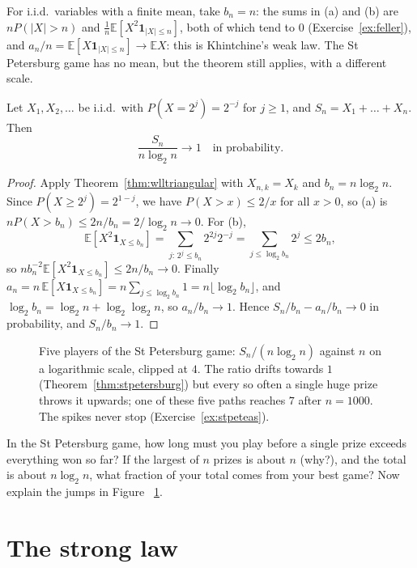 For i.i.d.\ variables with a finite mean, take $b_n=n$: the sums in (a) and (b) are $nP(|X|>n)$ and $\frac1n\mathbb E[X^2\mathbf 1_{|X|\le n}]$, both
of which tend to $0$ (Exercise~\ref{ex:feller}), and $a_n/n=\mathbb E[X\mathbf 1_{|X|\le n}]\to\mathbb E X$: this is Khintchine's weak law. The
St Petersburg game has no mean, but the theorem still applies, with a different scale.

\begin{theorem}[Feller, 1945]\label{thm:stpetersburg}
Let $X_1,X_2,\dots$ be i.i.d.\ with $P(X=2^j)=2^{-j}$ for $j\ge1$, and $S_n=X_1+\dots+X_n$. Then
\[
\frac{S_n}{n\log_2n}\to1\quad\text{in probability.}
\]
\end{theorem}
\begin{proof}
Apply Theorem~\ref{thm:wlltriangular} with $X_{n,k}=X_k$ and $b_n=n\log_2n$. Since $P(X\ge2^j)=2^{1-j}$, we have $P(X>x)\le2/x$ for all
$x>0$, so (a) is $nP(X>b_n)\le2n/b_n=2/\log_2n\to0$. For (b),
\[
\mathbb E[X^2\mathbf 1_{X\le b_n}]=\sum_{j:\,2^j\le b_n}2^{2j}2^{-j}=\sum_{j\le\log_2b_n}2^j\le2b_n,
\]
so $nb_n^{-2}\mathbb E[X^2\mathbf 1_{X\le b_n}]\le2n/b_n\to0$. Finally $a_n=n\,\mathbb E[X\mathbf 1_{X\le b_n}]=n\sum_{j\le\log_2b_n}1=n\lfloor\log_2b_n\rfloor$,
and $\log_2b_n=\log_2n+\log_2\log_2n$, so $a_n/b_n\to1$. Hence $S_n/b_n-a_n/b_n\to0$ in probability, and $S_n/b_n\to1$.
\end{proof}

\begin{figure}[ht]
\centering{}
\caption{Five players of the St Petersburg game: $S_n/(n\log_2n)$ against $n$ on a logarithmic scale, clipped at $4$. The ratio drifts towards $1$
(Theorem~\ref{thm:stpetersburg}) but every so often a single huge prize throws it upwards; one of these five paths reaches $7$ after $n=1000$.
The spikes never stop (Exercise~\ref{ex:stpeteas}).}
\label{fig:petersburg}
\end{figure}

\begin{think}
In the St Petersburg game, how long must you play before a single prize exceeds everything won so far? If the largest of $n$ prizes is about $n$
(why?), and the total is about $n\log_2n$, what fraction of your total comes from your best game? Now explain the jumps in Figure~
\ref{fig:petersburg}.
\end{think}

\section{The strong law}

